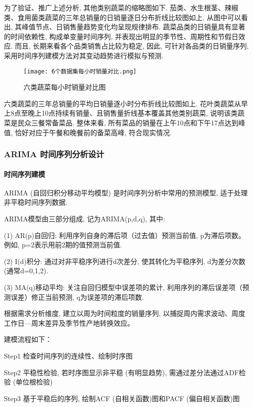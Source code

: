 \documentclass{cumcmthesis}
\begin{document}
为了验证、推广上述分析, 其他类别蔬菜的缩略图如下. 茄类、水生根茎、辣椒类、食用菌类蔬菜的三年总销量的日销量逐日分布折线比较图如上. 从图中可以看出, 其峰值节点、日销售量趋势变化均呈现规律排布. 蔬菜品类的日销量具有显著的时间依赖性, 构成单变量时间序列, 并表现出明显的季节性、周期性和节假日效应. 而且, 长期来看各个品类销售占比较为稳定, 因此, 可针对各品类的日销量序列, 采用时间序列建模方法对其变动趋势进行模拟与预测.

\begin{figure}[H]
    \centering
    \texttt{[image: 6个数据集每小时销量对比.png]} 
    \caption{六类蔬菜每小时销量对比图}
\end{figure}

六类蔬菜的三年总销量的平均日销量逐小时分布折线比较图如上. 花叶类蔬菜从早上8点至晚上10点持续有销量、且销售量折线基本覆盖其他类别蔬菜, 说明该类蔬菜是民众三餐常备菜品. 整体来看, 所有菜品的销量在上午10点和下午17点达到峰值, 恰好对应于午餐和晚餐前的备菜高峰, 符合现实情况.

\subsubsection{ARIMA 时间序列分析设计}

\paragraph{时间序列建模}
ARIMA (自回归积分移动平均模型) 是时间序列分析中常用的预测模型, 适于处理非平稳时间序列数据. 

ARIMA模型由三部分组成, 记为ARIMA(p,d,q), 其中: 


(1) AR(p)自回归: 利用序列自身的滞后项（过去值）预测当前值, p为滞后项数。例如, p=2表示用前2期的值预测当前值. 

(2) I(d)积分: 通过对非平稳序列进行d次差分, 使其转化为平稳序列, d为差分次数 (通常d=0,1,2). 

(3) MA(q)移动平均: 关注自回归模型中误差项的累计, 利用序列的滞后误差项（预测误差）修正当前预测, q为误差项的滞后项数. 

根据需求分析维度, 建立以周为时间粒度的销量序列, 以捕捉周内需求波动、周度工作日—周末差异及季节性产地转换效应。  

建模流程如下：  


Step1 检查时间序列的连续性、绘制时序图  

Step2 平稳性检验, 若时序图显示非平稳 (有明显趋势), 需通过差分法通过ADF检验 (单位根检验)  

Step3 基于平稳后的序列, 绘制ACF (自相关函数)图和PACF (偏自相关函数)图  
\end{document}
